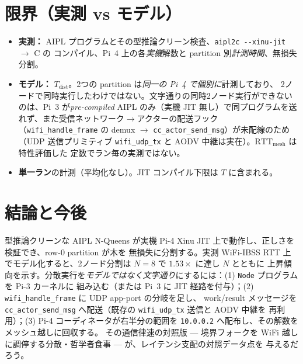 \documentclass[11pt]{ltjsarticle}
\begin{document}
\section{限界（実測 vs モデル）}
\begin{itemize}
  \item \textbf{実測：} AIPL プログラムとその型推論クリーン検査、\texttt{aipl2c -{}-xinu-jit} $\to$ C の
  コンパイル、Pi~4 上の各\emph{実機}解数と partition 別\emph{計測時間}、無損失分割。
  \item \textbf{モデル：} $T_\mathrm{dist}$。2つの partition は\emph{同一の Pi~4 で個別に}計測しており、
  2ノードで同時実行したわけではない。文字通りの同時2ノード実行ができないのは、Pi~3 が\emph{pre-compiled} AIPL
  のみ（実機 JIT 無し）で同プログラムを送れず、また受信ネットワーク$\to$アクターの配送フック
  （\texttt{wifi\_handle\_frame} の demux $\to$ \texttt{cc\_actor\_send\_msg}）が未配線のため
  （UDP 送信プリミティブ \texttt{wifi\_udp\_tx} と AODV 中継は実在）。$\mathrm{RTT_{mesh}}$ は特性評価した
  定数でラン毎の実測ではない。
  \item \textbf{単一ラン}の計測（平均化なし）。JIT コンパイル下限は $T$ に含まれる。
\end{itemize}

\section{結論と今後}
型推論クリーンな AIPL N-Queens が実機 Pi-4 Xinu JIT 上で動作し、正しさを検証でき、row-0 partition が木を
無損失に分割する。実測 WiFi-IBSS RTT 上でモデル化すると、2ノード分割は $N{=}8$ で $1.53\times$ に達し $N$ とともに
上昇傾向を示す。分散実行を\emph{モデルではなく文字通り}にするには：(1) \texttt{Node} プログラムを Pi-3 カーネルに
組み込む（または Pi~3 に JIT 経路を付与）；(2) \texttt{wifi\_handle\_frame} に UDP app-port の分岐を足し、
work/result メッセージを \texttt{cc\_actor\_send\_msg} へ配送（既存の \texttt{wifi\_udp\_tx} 送信と AODV 中継を
再利用）；(3) Pi-4 コーディネータが右半分の範囲を \texttt{10.0.0.2} へ配布し、その解数をメッシュ越しに回収する。
その通信律速の対照版 --- 境界フォークを WiFi 越しに調停する分散・哲学者食事 --- が、レイテンシ支配の対照データ点を
与えるだろう。
\end{document}
